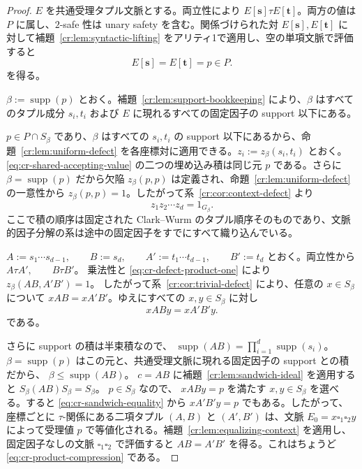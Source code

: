 \documentclass[10pt,a4paper]{ltjsarticle}
\theoremstyle{definition}
\theoremstyle{remark}
\newcommand{\blank}{\square}
\begin{document}
\begin{proof}
$E$ を共通受理タプル文脈とする。両立性により \(E[\mathbf s]\tau E[\mathbf t]\)。両方の値は $P$ に属し、$2$-safe 性は unary safety を含む。関係づけられた対 \(E[\mathbf s],E[\mathbf t]\) に対して補題~\ref{cr:lem:syntactic-lifting} をアリティ1で適用し、空の単項文脈で評価すると
\begin{equation}
E[\mathbf s]
=
E[\mathbf t]
=
p\in P.
\label{eq:cr-shared-accepting-value}
\end{equation}
を得る。

\(\beta:=\operatorname{supp}(p)\) とおく。補題~\ref{cr:lem:support-bookkeeping} により、$\beta$ はすべてのタプル成分 $s_i,t_i$ および $E$ に現れるすべての固定因子の support 以下にある。

$p\in P\cap S_\beta$ であり、$\beta$ はすべての $s_i,t_i$ の support 以下にあるから、命題~\ref{cr:lem:uniform-defect} を各座標対に適用できる。\(z_i:=z_\beta(s_i,t_i)\) とおく。\eqref{eq:cr-shared-accepting-value} の二つの埋め込み積は同じ元 $p$ である。さらに $\beta=\operatorname{supp}(p)$ だから欠陥 $z_\beta(p,p)$ は定義され、命題~\ref{cr:lem:uniform-defect} の一意性から $z_\beta(p,p)=1$。したがって系~\ref{cr:cor:context-defect} より
\begin{equation}
z_1z_2\cdots z_d
=
1_{G_\beta}.
\label{eq:cr-defect-product-one}
\end{equation}
ここで積の順序は固定された Clark--Wurm のタプル順序そのものであり、文脈的因子分解の系は途中の固定因子をすでにすべて織り込んでいる。

\(A:=s_1\cdots s_{d-1}, \qquad B:=s_d, \qquad A':=t_1\cdots t_{d-1}, \qquad B':=t_d\)
とおく。両立性から
\(A\tau A', \qquad B\tau B'\)。
乗法性と \eqref{eq:cr-defect-product-one} により
\(z_\beta(AB,A'B')=1\)。
したがって系~\ref{cr:cor:trivial-defect} により、任意の $x\in S_\beta$ について
\(xAB=xA'B'\)。ゆえにすべての $x,y\in S_\beta$ に対し
\begin{equation}
xABy=xA'B'y.
\label{eq:cr-sandwich-equality}
\end{equation}
である。

さらに support の積は半束積なので、
\(\operatorname{supp}(AB)=\prod_{i=1}^d\operatorname{supp}(s_i)\)。
$\beta=\operatorname{supp}(p)$ はこの元と、共通受理文脈に現れる固定因子の support との積だから、
\(\beta\le\operatorname{supp}(AB)\)。
$c=AB$ に補題~\ref{cr:lem:sandwich-ideal} を適用すると
\(S_\beta(AB)S_\beta=S_\beta\)。
$p\in S_\beta$ なので、
\(xABy=p\)
を満たす $x,y\in S_\beta$ を選べる。すると \eqref{eq:cr-sandwich-equality} から
\(xA'B'y=p\)
でもある。したがって、座標ごとに $\tau$-関係にある二項タプル $(A,B)$ と $(A',B')$ は、文脈
$E_0=x\blank_1\blank_2y$
によって受理値 $p$ で等値化される。補題~\ref{cr:lem:equalizing-context} を適用し、固定因子なしの文脈 $\blank_1\blank_2$ で評価すると $AB=A'B'$ を得る。これはちょうど \eqref{eq:cr-product-compression} である。
\end{proof}
\end{document}
